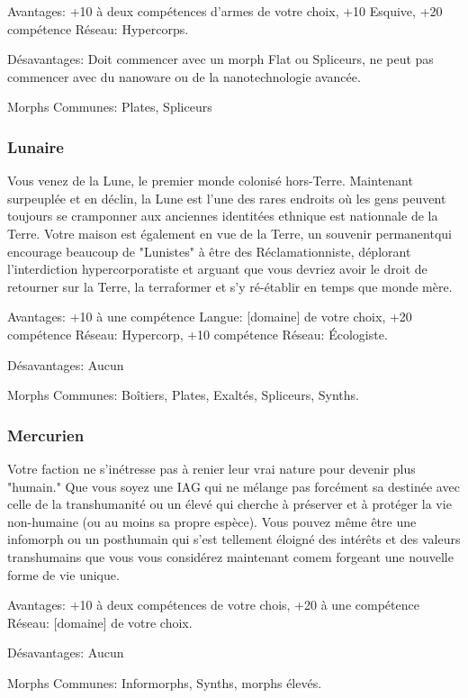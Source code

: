 Avantages: +10 à deux compétences d'armes de votre choix, +10 Esquive, +20 compétence Réseau: Hypercorps. 

Désavantages: Doit commencer avec un morph Flat ou Spliceurs, ne peut pas commencer avec du nanoware ou de la nanotechnologie avancée. 

Morphs Communes: Plates, Spliceurs 

\subsubsection{Lunaire} \label{sec:lunar} 

Vous venez de la Lune, le premier monde colonisé hors-Terre. Maintenant surpeuplée et en déclin, la Lune est l'une des rares endroits où les gens peuvent toujours se cramponner aux anciennes identitées ethnique est nationnale de la Terre. Votre maison est également en vue de la Terre, un souvenir permanentqui encourage beaucoup de "Lunistes" à être des Réclamationniste, déplorant l'interdiction hypercorporatiste et arguant que vous devriez avoir le droit de retourner sur la Terre, la terraformer et s'y ré-établir en temps que monde mère. 

Avantages: +10 à une compétence Langue: [domaine] de votre choix, +20 compétence Réseau: Hypercorp, +10 compétence Réseau: Écologiste. 

Désavantages: Aucun 

Morphs Communes: Boîtiers, Plates, Exaltés, Spliceurs, Synths. 

\subsubsection{Mercurien} \label{sec:mercurial} 

Votre faction ne s'inétresse pas à renier leur vrai nature pour devenir plus "humain." Que vous soyez une IAG qui ne mélange pas forcément sa destinée avec celle de la transhumanité ou un élevé qui cherche à préserver et à protéger la vie non-humaine (ou au moins sa propre espèce). Vous pouvez même être une infomorph ou un posthumain qui s'est tellement éloigné des intérêts et des valeurs transhumains que vous vous considérez maintenant comem forgeant une nouvelle forme de vie unique. 

Avantages: +10 à deux compétences de votre chois, +20 à une compétence Réseau: [domaine] de votre choix. 

Désavantages: Aucun 

Morphs Communes: Informorphs, Synths, morphs élevés. 

